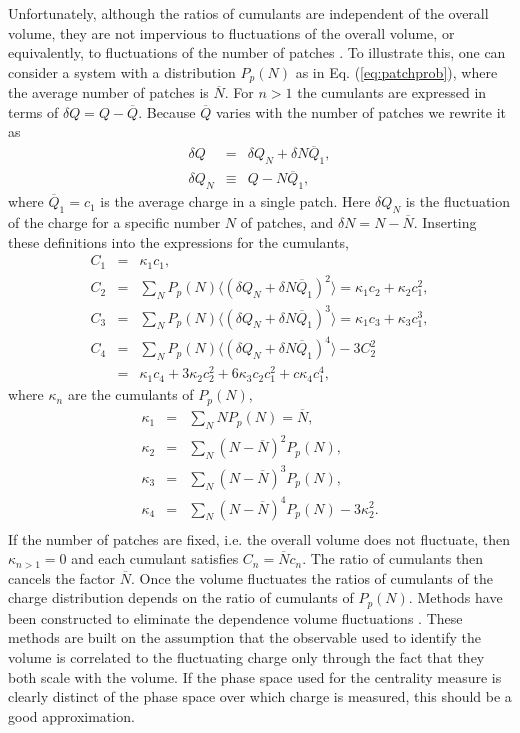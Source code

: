 \documentclass[aps,prc,nofootinbib,showpacs,superscriptaddress,groupedaddress]{revtex4-1}
\begin{document}
Unfortunately, although the ratios of cumulants are independent of the overall volume, they are not impervious to fluctuations of the overall volume, or equivalently, to fluctuations of the number of patches \cite{volumefluc}. To illustrate this, one can consider a system with a distribution $P_p(N)$  as in Eq. (\ref{eq:patchprob}), where the average number of patches is $\overline{N}$. For $n>1$ the cumulants are expressed in terms of $\delta Q=Q-\overline{Q}$. Because $\overline{Q}$ varies with the number of patches we rewrite it as
\begin{eqnarray}
\delta Q&=&\delta Q_N+\delta N\overline{Q}_1,\\
\delta Q_N&\equiv&Q-N\overline{Q}_1,
\end{eqnarray}
where $\overline{Q}_1=c_1$ is the average charge in a single patch. Here $\delta Q_N$ is the fluctuation of the charge for a specific number $N$ of patches, and $\delta N=N-\overline{N}$. Inserting these definitions into the expressions for the cumulants,
\begin{eqnarray}\label{eq:volfluc}
C_1&=&\kappa_1c_1,\\
\nonumber
C_2&=&\sum_NP_p(N) \langle(\delta Q_N+\delta N\overline{Q}_1)^2\rangle=\kappa_1c_2+\kappa_2c_1^2,\\
\nonumber
C_3&=&\sum_NP_p(N) \langle(\delta Q_N+\delta N\overline{Q}_1)^3\rangle=\kappa_1c_3+\kappa_3c_1^3,\\
\nonumber
C_4&=&\sum_NP_p(N) \langle(\delta Q_N+\delta N\overline{Q}_1)^4\rangle-3C_2^2\\
\nonumber
&=&\kappa_1c_4+3\kappa_2c_2^2+6\kappa_3c_2c_1^2+c\kappa_4c_1^4,
\end{eqnarray}
where $\kappa_n$ are the cumulants of $P_p(N)$,
\begin{eqnarray}\label{eq:kappadef}
\kappa_1&=&\sum_N NP_p(N)=\overline{N},\\
\nonumber
\kappa_2&=&\sum_N (N-\overline{N})^2P_p(N),\\
\nonumber
\kappa_3&=&\sum_N (N-\overline{N})^3P_p(N),\\
\nonumber
\kappa_4&=&\sum_N (N-\overline{N})^4P_p(N)-3\kappa_2^2.\\
\end{eqnarray}
If the number of patches are fixed, i.e. the overall volume does not fluctuate, then $\kappa_{n>1}=0$ and each cumulant satisfies $C_n=\overline{N} c_n$. The ratio of cumulants then cancels the factor $\overline{N}$. 
Once the volume fluctuates the ratios of cumulants of the charge distribution depends on the ratio of cumulants of $P_p(N)$. Methods have been constructed to eliminate the dependence volume fluctuations \cite{Begun:2014boa,Gazdzicki:2013ana,Gorenstein:2011vq,Sangaline:2015bma}. These methods are built on the assumption that the observable used to identify the volume is correlated to the fluctuating charge only through the fact that they both scale with the volume. If the phase space used for the centrality measure is clearly distinct of the phase space over which charge is measured, this should be a good approximation. 
\end{document}

